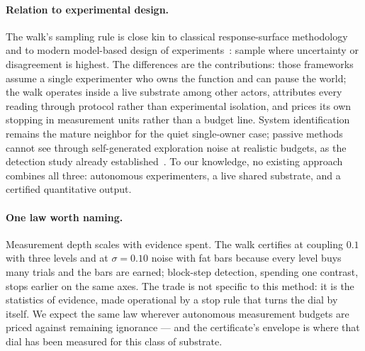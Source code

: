 \documentclass[11pt,a4paper]{article}
\begin{document}
\paragraph{Relation to experimental design.}
The walk's sampling rule is close kin to classical response-surface
methodology~\cite{box1951rsm} and to modern model-based design of
experiments~\cite{jones1998ego}: sample where uncertainty or
disagreement is highest. The differences are the contributions:
those frameworks assume a single experimenter who owns the function
and can pause the world; the walk operates inside a live substrate
among other actors, attributes every reading through protocol
rather than experimental isolation, and prices its own stopping in
measurement units rather than a budget line. System
identification~\cite{ljung1999sid} remains the mature neighbor for
the quiet single-owner case; passive
methods~\cite{sugihara2012ccm} cannot see through self-generated
exploration noise at realistic budgets, as the detection study
already established~\cite{p1}. To our knowledge, no existing approach combines all three:
autonomous experimenters, a live shared substrate, and a certified
quantitative output.

\paragraph{One law worth naming.}
Measurement depth scales with evidence spent. The walk certifies at
coupling $0.1$ with three levels and at $\sigma{=}0.10$ noise with
fat bars because every level buys many trials and the bars are
earned; block-step detection, spending one contrast, stops earlier
on the same axes. The trade is not specific to this method: it
is the statistics of evidence, made operational by a stop rule that
turns the dial by itself. We expect the same law wherever
autonomous measurement budgets are priced against remaining
ignorance --- and the certificate's envelope is where that dial has
been measured for this class of substrate.



\end{document}
